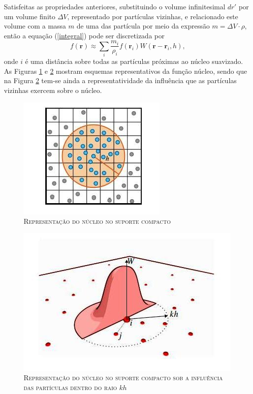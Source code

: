Satisfeitas as propriedades anteriores, substituindo o volume infinitesimal $dr'$ por um volume finito $\Delta V$, representado por partículas vizinhas, e relacionado este volume com a massa $m$ de uma das partícula por meio da expressão $m= \Delta V \cdot \rho$, então a equação (\ref{integral}) pode ser discretizada por
\begin{equation} \label{aprox_SPH}
f(\textbf{r}) \approx \sum\limits_{i} \frac{m_{i}}{\rho_{i}} f(\textbf{r}_{i}) W(\textbf{r} - \textbf{r}_{i},h),
\end{equation} 
onde $i$ é uma distância sobre todas as partículas próximas ao núcleo suavizado. As Figuras \ref{fig:nucleo_B} e \ref{fig:nucleo_A} mostram esquemas representativos da função núcleo, sendo que na Figura \ref{fig:nucleo_A} tem-se ainda a representatividade da influência que as partículas vizinhas exercem sobre o núcleo.

\begin{figure}[H]
	\centering
	\includegraphics[scale=1]{figuras/nucleo_B.jpg}
	\caption{\textsc{Representação do núcleo no suporte compacto}}
	\vspace{-0.1cm}
	\label{fig:nucleo_B}
\end{figure}

\begin{figure}[H]
	\centering
	\includegraphics[scale=1]{figuras/nucleo_A.jpg}
	\caption{\textsc{Representação do núcleo no suporte compacto sob a influência das partículas dentro do raio $kh$}}
	\vspace{-0.1cm}
	\label{fig:nucleo_A}
\end{figure}       

